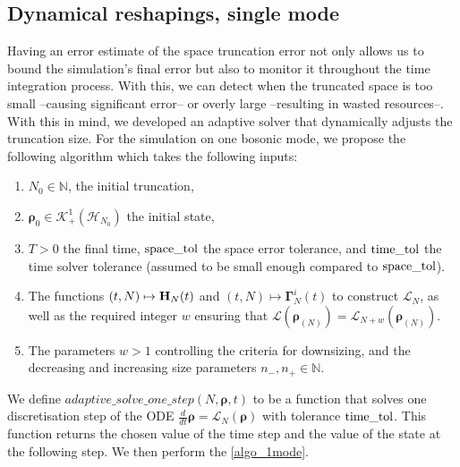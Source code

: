 \documentclass[a4paper,onecolumn,amsmath,amssymb,amsfonts,accepted=2026-03-06]{quantumarticle}
\newcommand{\xL}{\mathcal{L}}
\newcommand{\xH}{\mathcal{H}}
\newcommand{\xK}{\mathcal{K}}
\newcommand{\xN}{\mathbb{N}}
\newcommand{\LL}{{\mathbf{\Gamma}}}
\newcommand{\Hamil}{{\bf H}}
\newcommand{\rN}{{\boldsymbol{\rho}_{(N)}}}
\begin{document}
\subsection{Dynamical reshapings, single mode}
\label{sec:reshapings}
Having an error estimate of the space truncation error not only allows us to bound the simulation's final error but also to monitor it throughout the time integration process. With this, we can detect when the truncated space is too small --causing significant error-- or overly large --resulting in wasted resources--. With this in mind, we developed an adaptive solver that dynamically adjusts the truncation size.
For the simulation on one bosonic mode, we propose the following algorithm which takes the following inputs:
\begin{enumerate}
\item $N_0\in \xN$, the initial truncation,
\item $\boldsymbol{\rho}_0\in \xK^1_+(\xH_{N_0})$ the initial state,
\item $T>0$ the final time, $\text{\texttt{space\_tol}}$ the space error tolerance, and $\text{\texttt{time\_tol}}$ the time solver tolerance (assumed to be small enough compared to $\text{\texttt{space\_tol}}$).
\item The functions $(t,N)\mapsto \Hamil_N(t)$ and $(t,N)\mapsto \LL^i_N(t)$ to construct $\xL_N$, as well as the required integer $w$ ensuring that $\xL(\rN)=\xL_{N+w}(\rN)$.
\item The parameters $w>1$ controlling the criteria for downsizing, and the decreasing and increasing size parameters $ n_-,n_+\in \xN$.
\end{enumerate}
We define $adaptive\_solve\_one\_step(N,\boldsymbol{\rho},t)$ to be a function that solves one discretisation step of the ODE $\frac{d}{dt}\boldsymbol{\rho}= \xL_N(\boldsymbol{\rho})$ with tolerance $\text{\texttt{time\_tol}}$. This function returns the chosen value of the time step and the value of the state at the following step.
We then perform the \cref{algo_1mode}.
\end{document}

